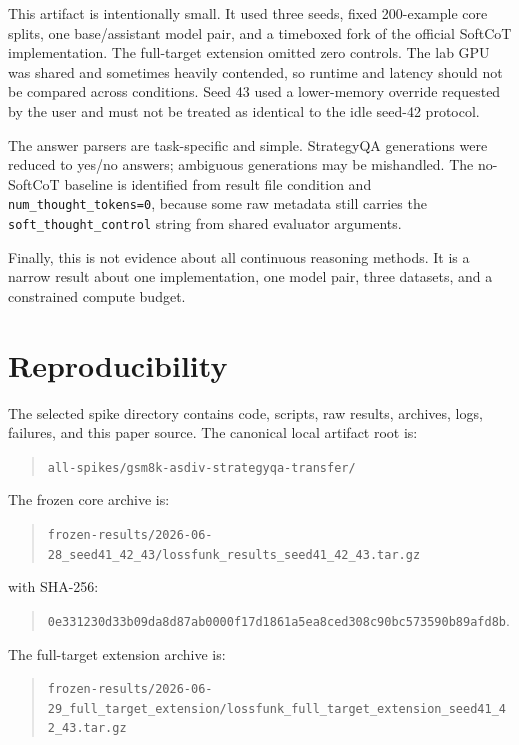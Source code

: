 \documentclass{article}
\begin{document}
This artifact is intentionally small. It used three seeds, fixed 200-example core splits, one base/assistant model pair, and a timeboxed fork of the official SoftCoT implementation. The full-target extension omitted zero controls. The lab GPU was shared and sometimes heavily contended, so runtime and latency should not be compared across conditions. Seed 43 used a lower-memory override requested by the user and must not be treated as identical to the idle seed-42 protocol.

The answer parsers are task-specific and simple. StrategyQA generations were reduced to yes/no answers; ambiguous generations may be mishandled. The no-SoftCoT baseline is identified from result file condition and \texttt{num\_thought\_tokens=0}, because some raw metadata still carries the \texttt{soft\_thought\_control} string from shared evaluator arguments.

Finally, this is not evidence about all continuous reasoning methods. It is a narrow result about one implementation, one model pair, three datasets, and a constrained compute budget.

\section{Reproducibility}

The selected spike directory contains code, scripts, raw results, archives, logs, failures, and this paper source. The canonical local artifact root is:

\begin{quote}
\texttt{all-spikes/gsm8k-asdiv-strategyqa-transfer/}
\end{quote}

The frozen core archive is:

\begin{quote}
\texttt{frozen-results/2026-06-28\_seed41\_42\_43/lossfunk\_results\_seed41\_42\_43.tar.gz}
\end{quote}

with SHA-256:

\begin{quote}
\texttt{0e331230d33b09da8d87ab0000f17d1861a5ea8ced308c90bc573590b89afd8b}.
\end{quote}

The full-target extension archive is:

\begin{quote}
\texttt{frozen-results/2026-06-29\_full\_target\_extension/lossfunk\_full\_target\_extension\_seed41\_42\_43.tar.gz}
\end{quote}
\end{document}
